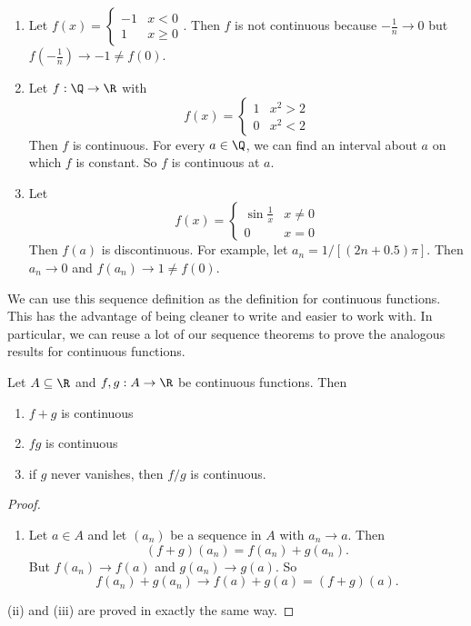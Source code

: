 \documentclass[a4paper]{article}
\begin{document}
\begin{eg}\leavevmode
  \begin{enumerate}
    \item Let $f(x) = \begin{cases} -1 & x < 0 \\ 1 & x\geq 0\end{cases}$. Then $f$ is not continuous because $-\frac{1}{n} \to 0$ but $f(-\frac{1}{n}) \to -1 \not= f(0)$.
    \item Let $f: \Q \to \R$ with
      \[
        f(x) =
        \begin{cases}
          1 & x^2 > 2\\
          0 & x^2 < 2
        \end{cases}
      \]
      Then $f$ is continuous. For every $a\in \Q$, we can find an interval about $a$ on which $f$ is constant. So $f$ is continuous at $a$.
    \item Let
      \[
        f(x) =
        \begin{cases}
          \sin \frac{1}{x} & x \not= 0\\
          0 & x = 0
        \end{cases}
      \]
      Then $f(a)$ is discontinuous. For example, let $a_n = 1/[(2n + 0.5)\pi]$. Then $a_n\to 0$ and $f(a_n) \to 1 \not= f(0)$.
  \end{enumerate}
\end{eg}
We can use this sequence definition as the definition for continuous functions. This has the advantage of being cleaner to write and easier to work with. In particular, we can reuse a lot of our sequence theorems to prove the analogous results for continuous functions.

\begin{lemma}
  Let $A\subseteq \R$ and $f, g: A\to \R$ be continuous functions. Then
  \begin{enumerate}
    \item $f + g$ is continuous
    \item $fg$ is continuous
    \item if $g$ never vanishes, then $f/g$ is continuous.
  \end{enumerate}
\end{lemma}

\begin{proof}\leavevmode
  \begin{enumerate}
    \item Let $a\in A$ and let $(a_n)$ be a sequence in $A$ with $a_n \to a$. Then
      \[
        (f + g)(a_n) = f(a_n) + g(a_n).
      \]
      But $f(a_n) \to f(a)$ and $g(a_n) \to g(a)$. So
      \[
        f(a_n) + g(a_n) \to f(a) + g(a) = (f + g)(a).
      \]
  \end{enumerate}
  (ii) and (iii) are proved in exactly the same way.
\end{proof}
\end{document}
